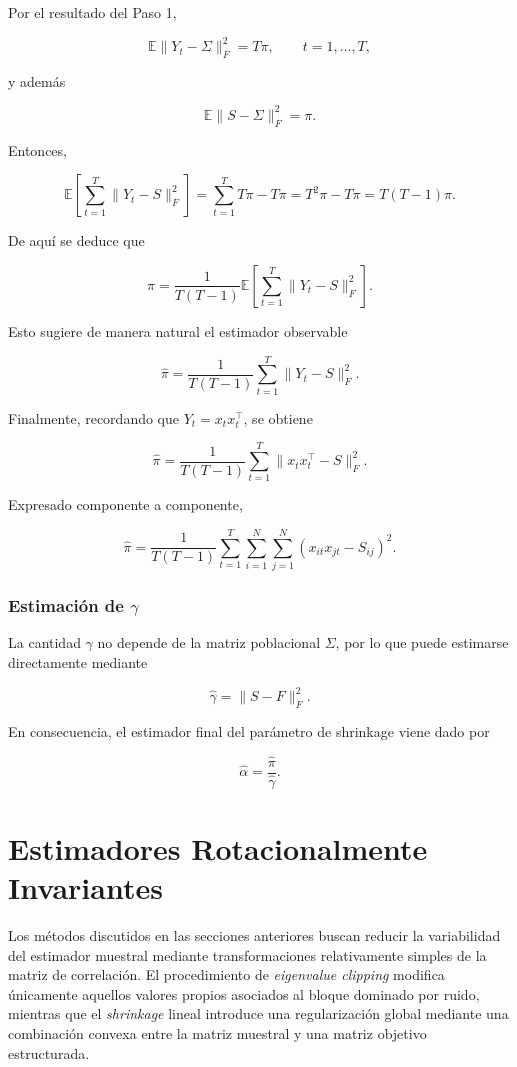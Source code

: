 \documentclass[letterpaper,12pt,oneside]{book}
\begin{document}
Por el resultado del Paso 1,

\[
\mathbb{E}\|Y_t-\Sigma\|_F^2 = T\pi,
\qquad t=1,\dots,T,
\]

y además

\[
\mathbb{E}\|S-\Sigma\|_F^2 = \pi.
\]

Entonces,

\[
\mathbb{E}\left[\sum_{t=1}^{T}\|Y_t-S\|_F^2\right]
=
\sum_{t=1}^{T}T\pi - T\pi
=
T^2\pi - T\pi
=
T(T-1)\pi.
\]

De aquí se deduce que

\[
\pi
=
\frac{1}{T(T-1)}
\mathbb{E}\left[\sum_{t=1}^{T}\|Y_t-S\|_F^2\right].
\]

Esto sugiere de manera natural el estimador observable

\[
\hat{\pi}
=
\frac{1}{T(T-1)}
\sum_{t=1}^{T}\|Y_t-S\|_F^2.
\]

Finalmente, recordando que $Y_t=x_t x_t^\top$, se obtiene

\[
\hat{\pi}
=
\frac{1}{T(T-1)}
\sum_{t=1}^{T}\|x_t x_t^\top - S\|_F^2.
\]

Expresado componente a componente,

\[
\hat{\pi}
=
\frac{1}{T(T-1)}
\sum_{t=1}^{T}
\sum_{i=1}^{N}\sum_{j=1}^{N}
(x_{it}x_{jt}-S_{ij})^2.
\]

\subsubsection*{Estimación de $\gamma$}

La cantidad $\gamma$ no depende de la matriz poblacional $\Sigma$, por lo que puede estimarse directamente mediante

\[
\hat{\gamma}=\|S-F\|_F^2.
\]

En consecuencia, el estimador final del parámetro de shrinkage viene dado por

\[
\hat{\alpha}=\frac{\hat{\pi}}{\hat{\gamma}}.
\]

\section{Estimadores Rotacionalmente Invariantes}

Los métodos discutidos en las secciones anteriores buscan reducir la variabilidad del estimador muestral mediante transformaciones relativamente simples de la matriz de correlación. El procedimiento de \textit{eigenvalue clipping} modifica únicamente aquellos valores propios asociados al bloque dominado por ruido, mientras que el \textit{shrinkage} lineal introduce una regularización global mediante una combinación convexa entre la matriz muestral y una matriz objetivo estructurada.
\end{document}
